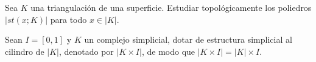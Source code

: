 \documentclass[twoside]{article}
\begin{document}
\newpage

\begin{ejercicio}{1.11}
Sea $K$ una triangulación de una superficie.
Estudiar topológicamente los poliedros $|st(x;K)|$ para todo $x \in |K|$.
\end{ejercicio}
\begin{solucion}
\end{solucion}

\newpage

\begin{ejercicio}{1.12}
Sean $I = [0,1]$ y $K$ un complejo simplicial, dotar de estructura simplicial al cilindro de $|K|$, denotado por $|K \times I|$, de modo que $|K \times I| = |K| \times I$.
\end{ejercicio}
\begin{solucion}
\end{solucion}

\newpage
\end{document}
